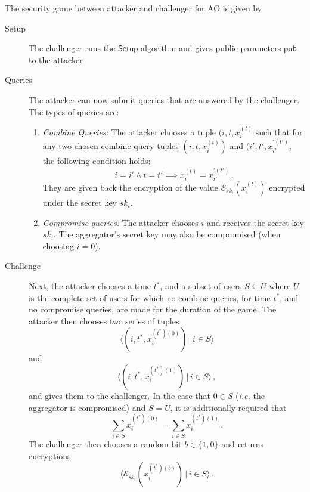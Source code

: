 \documentclass[twocolumn]{autart}
\theoremstyle{definition}
\theoremstyle{remark}
\begin{document}
The security game between attacker and challenger for AO is given by
\begin{description}
    \item[Setup] The challenger runs the $\mathsf{Setup}$ algorithm and gives public parameters $\mathsf{pub}$ to the attacker
    \item[Queries] The attacker can now submit queries that are answered by the challenger. The types of queries are:
    \begin{enumerate}
        \item \textit{Combine Queries:} The attacker chooses a tuple $(i,t,x^{(t)}_i$ such that for any two chosen combine query tuples $(i,t,x^{(t)}_i)$ and $(i',t',x^{\prime(t')}_{i'}$, the following condition holds:
        \begin{equation*}
            i = i' \wedge t = t' \implies x^{(t)}_{i} = x^{\prime(t')}_{i'}\,.
        \end{equation*}
        They are given back the encryption of the value $\mathcal{E}_{sk_i}(x^{(t)}_i)$ encrypted under the secret key $sk_i$.
        \item \textit{Compromise queries:} The attacker chooses $i$ and receives the secret key $sk_i$. The aggregator's secret key may also be compromised (when choosing $i=0$).
    \end{enumerate} 
    \item[Challenge] Next, the attacker chooses a time $t^*$, and a subset of users $S \subseteq U$ where $U$ is the complete set of users for which no combine queries, for time $t^*$, and no compromise queries, are made for the duration of the game. The attacker then chooses two series of tuples
    \begin{equation*}
        \langle(i,t^*,x^{(t^*)(0)}_i)\,|\,i \in S\rangle
    \end{equation*}
    and
    \begin{equation*}
        \langle(i,t^*,x^{(t^*)(1)}_i)\,|\, i \in S\rangle\,,
    \end{equation*}
    and gives them to the challenger. In the case that $0 \in S$ (\textit{i.e.} the aggregator is compromised) and $S = U$, it is additionally required that
    \begin{equation*}
        \sum_{i\in S} x^{(t^*)(0)}_i = \sum_{i \in S} x^{(t^*)(1)}_i\,.
    \end{equation*}
    The challenger then chooses a random bit $b \in \{1,0\}$ and returns encryptions 
    \begin{equation*}
        \langle\mathcal{E}_{sk_i}(x^{(t^*)(b)}_i)\,|\,i\in S\rangle\,.

\end{equation*}
\end{description}
\end{document}

